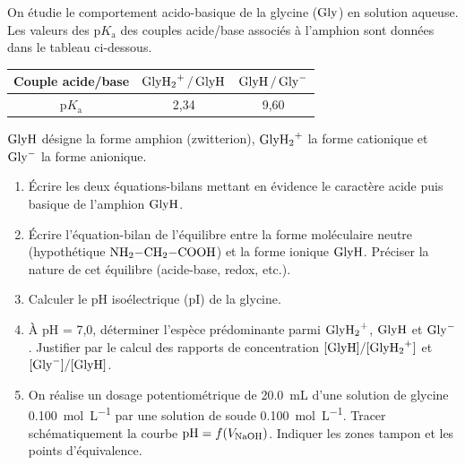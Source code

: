 \documentclass[11pt]{article}
\begin{document}
\begin{exercice}
On étudie le comportement acido-basique de la glycine ($\ce{Gly}$) en solution aqueuse. Les valeurs des p$K_{\text{a}}$ des couples acide/base associés à l'amphion sont données dans le tableau ci-dessous.

\begin{center}
\begin{tabular}{|c|c|c|}
\hline
Couple acide/base & $\ce{GlyH2+ / GlyH}$ & $\ce{GlyH / Gly-}$ \\
\hline
p$K_{\text{a}}$ & 2,34 & 9,60 \\
\hline
\end{tabular}
\end{center}

$\ce{GlyH}$ désigne la forme amphion (zwitterion), $\ce{GlyH2+}$ la forme cationique et $\ce{Gly-}$ la forme anionique.
\begin{enumerate}
    \item Écrire les deux équations-bilans mettant en évidence le caractère acide puis basique de l'amphion $\ce{GlyH}$. 
    \item Écrire l'équation-bilan de l'équilibre entre la forme moléculaire neutre (hypothétique $\ce{NH2-CH2-COOH}$) et la forme ionique $\ce{GlyH}$. Préciser la nature de cet équilibre (acide-base, redox, etc.).
    \item Calculer le pH isoélectrique (pI) de la glycine. 
    \item À pH = 7,0, déterminer l'espèce prédominante parmi $\ce{GlyH2+}$, $\ce{GlyH}$ et $\ce{Gly-}$. Justifier par le calcul des rapports de concentration $[\ce{GlyH}]/[\ce{GlyH2+}]$ et $[\ce{Gly-}]/[\ce{GlyH}]$.
    \item On réalise un dosage potentiométrique de \SI{20,0}{\milli\liter} d'une solution de glycine \SI{0,100}{\mole\per\liter} par une solution de soude \SI{0,100}{\mole\per\liter}. Tracer schématiquement la courbe $\mathrm{pH} = f(V_{\ce{NaOH}})$. Indiquer les zones tampon et les points d'équivalence.
\end{enumerate}
\end{exercice}
\end{document}
